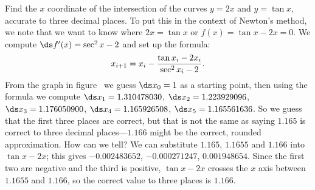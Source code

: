 \begin{example} Find the $x$ coordinate of the intersection of the curves $y=2x$
and $y=\tan x$, accurate to three decimal places. To put this in the
context of Newton's method, we note that we want to know where $2x=\tan
x$ or $f(x)=\tan x-2x=0$. We compute $\ds f'(x)=\sec^2 x - 2$ and set up the
formula:
$$x_{i+1} = x_i-{\tan x_i -2x_i\over \sec^2 x_i - 2}.$$ From the graph
in figure~ 
we guess $\ds x_0=1$ as a starting point, then using the formula we
compute $\ds x_1=1.310478030$, $\ds x_2=1.223929096$, $\ds x_3=1.176050900$,
$\ds x_4=1.165926508$, $\ds x_5=1.165561636$.  So we guess that the first
three places are correct, but that is not the same as saying $1.165$
is correct to three decimal places---$1.166$ might be the correct,
rounded approximation. How can we tell? We can substitute $1.165$,
$1.1655$ and $1.166$ into $\tan x - 2x$; this
gives $-0.002483652$, $-0.000271247$, $0.001948654$. Since the first
two are negative and the third is positive, $\tan x - 2x$ crosses the
$x$ axis between $1.1655$ and $1.166$, so the correct value to three
places is $1.166$.
\end{example}


